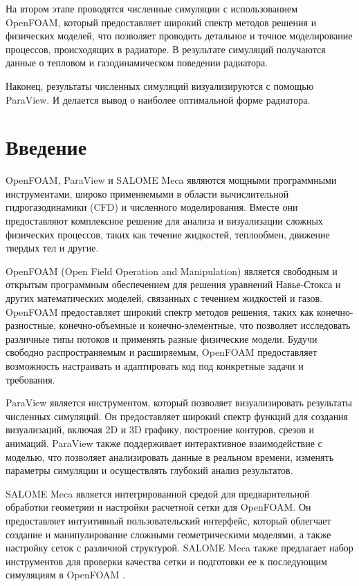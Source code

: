 \documentclass[a4paper,12pt]{article}
\theoremstyle{plain} %
\theoremstyle{definition} %
\theoremstyle{remark} %
\begin{document}
На втором этапе проводятся численные симуляции с использованием OpenFOAM, который предоставляет широкий спектр методов решения и физических моделей, что позволяет проводить детальное и точное моделирование процессов, происходящих в радиаторе. В результате симуляций получаются данные о тепловом и газодинамическом поведении радиатора.

Наконец, результаты численных симуляций визуализируются с помощью ParaView. И делается вывод о наиболее оптимальной форме радиатора.

\newpage 
\tableofcontents
\setcounter{page}{3}

\newpage
\section{Введение}


OpenFOAM, ParaView и SALOME Meca являются мощными программными инструментами, широко применяемыми в области вычислительной гидрогазодинамики (CFD) и численного моделирования. Вместе они предоставляют комплексное решение для анализа и визуализации сложных физических процессов, таких как течение жидкостей, теплообмен, движение твердых тел и другие.

OpenFOAM (Open Field Operation and Manipulation) является свободным и открытым программным обеспечением для решения уравнений Навье-Стокса и других математических моделей, связанных с течением жидкостей и газов. OpenFOAM предоставляет широкий спектр методов решения, таких как конечно-разностные, конечно-объемные и конечно-элементные, что позволяет исследовать различные типы потоков и применять разные физические модели. Будучи свободно распространяемым и расширяемым, OpenFOAM предоставляет возможность настраивать и адаптировать код под конкретные задачи и требования.

ParaView является инструментом, который позволяет визуализировать результаты численных симуляций. Он предоставляет широкий спектр функций для создания визуализаций, включая 2D и 3D графику, построение контуров, срезов и анимаций. ParaView также поддерживает интерактивное взаимодействие с моделью, что позволяет анализировать данные в реальном времени, изменять параметры симуляции и осуществлять глубокий анализ результатов.

SALOME Meca является интегрированной средой для предварительной обработки геометрии и настройки расчетной сетки для OpenFOAM. Он предоставляет интуитивный пользовательский интерфейс, который облегчает создание и манипулирование сложными геометрическими моделями, а также настройку сеток с различной структурой. SALOME Meca также предлагает набор инструментов для проверки качества сетки и подготовки ее к последующим симуляциям в OpenFOAM \cite{wOfDocSalome}.
\end{document}
